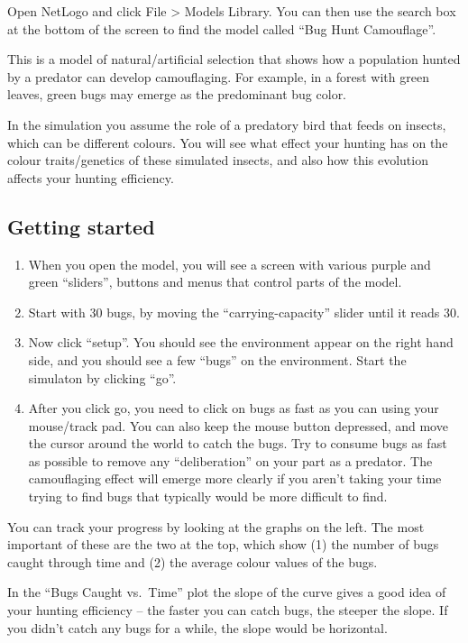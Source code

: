 \documentclass[
  a4paper]{book}
\providecommand{\tightlist}{%
  \setlength{\itemsep}{0pt}\setlength{\parskip}{0pt}}
\begin{document}
Open NetLogo and click File \textgreater{} Models Library. You can then use the search box at the bottom of the screen to find the model called ``Bug Hunt Camouflage''.

This is a model of natural/artificial selection that shows how a population hunted by a predator can develop camouflaging. For example, in a forest with green leaves, green bugs may emerge as the predominant bug color.

In the simulation you assume the role of a predatory bird that feeds on insects, which can be different colours. You will see what effect your hunting has on the colour traits/genetics of these simulated insects, and also how this evolution affects your hunting efficiency.

\subsection{Getting started}\label{getting-started}

\begin{enumerate}
\def\labelenumi{\arabic{enumi}.}
\tightlist
\item
  When you open the model, you will see a screen with various purple and green ``sliders'', buttons and menus that control parts of the model.
\item
  Start with 30 bugs, by moving the ``carrying-capacity'' slider until it reads 30.
\item
  Now click ``setup''. You should see the environment appear on the right hand side, and you should see a few ``bugs'' on the environment. Start the simulaton by clicking ``go''.
\item
  After you click go, you need to click on bugs as fast as you can using your mouse/track pad. You can also keep the mouse button depressed, and move the cursor around the world to catch the bugs. Try to consume bugs as fast as possible to remove any ``deliberation'' on your part as a predator. The camouflaging effect will emerge more clearly if you aren't taking your time trying to find bugs that typically would be more difficult to find.
\end{enumerate}

You can track your progress by looking at the graphs on the left. The most important of these are the two at the top, which show (1) the number of bugs caught through time and (2) the average colour values of the bugs.

In the ``Bugs Caught vs.~Time'' plot the slope of the curve gives a good idea of your hunting efficiency -- the faster you can catch bugs, the steeper the slope. If you didn't catch any bugs for a while, the slope would be horizontal.
\end{document}
